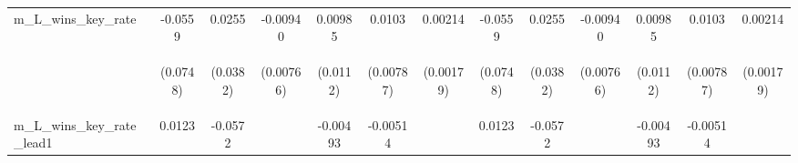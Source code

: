 \documentclass[]{article}
\begin{document}
\begin{center}
\begin{tabular}{lcccccccccccc}
m\_L\_wins\_key\_rate & -0.0559 & 0.0255 & -0.00940 & 0.00985 & 0.0103 & 0.00214 & -0.0559 & 0.0255 & -0.00940 & 0.00985 & 0.0103 & 0.00214 \\
\vspace{4pt} & \begin{footnotesize}(0.0748)\end{footnotesize} & \begin{footnotesize}(0.0382)\end{footnotesize} & \begin{footnotesize}(0.00766)\end{footnotesize} & \begin{footnotesize}(0.0112)\end{footnotesize} & \begin{footnotesize}(0.00787)\end{footnotesize} & \begin{footnotesize}(0.00179)\end{footnotesize} & \begin{footnotesize}(0.0748)\end{footnotesize} & \begin{footnotesize}(0.0382)\end{footnotesize} & \begin{footnotesize}(0.00766)\end{footnotesize} & \begin{footnotesize}(0.0112)\end{footnotesize} & \begin{footnotesize}(0.00787)\end{footnotesize} & \begin{footnotesize}(0.00179)\end{footnotesize} \\
m\_L\_wins\_key\_rate\_lead1 & 0.0123 & -0.0572 &  & -0.00493 & -0.00514 &  & 0.0123 & -0.0572 &  & -0.00493 & -0.00514 &  \\

\end{tabular}
\end{center}
\end{document}
